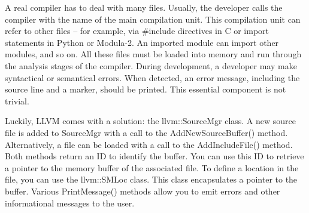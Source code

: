 A real compiler has to deal with many files. Usually, the developer calls the compiler with the name of the main compilation unit. This compilation unit can refer to other files – for example, via \#include directives in C or import statements in Python or Modula-2. An imported module can import other modules, and so on. All these files must be loaded into memory and run through the analysis stages of the compiler. During development, a developer may make syntactical or semantical errors. When detected, an error message, including the source line and a marker, should be printed. This essential component is not trivial.

Luckily, LLVM comes with a solution: the llvm::SourceMgr class. A new source file is added to SourceMgr with a call to the AddNewSourceBuffer() method. Alternatively, a file can be loaded with a call to the AddIncludeFile() method. Both methods return an ID to identify the buffer. You can use this ID to retrieve a pointer to the memory buffer of the associated file. To define a location in the file, you can use the llvm::SMLoc class. This class encapsulates a pointer to the buffer. Various PrintMessage() methods allow you to emit errors and other informational messages to the user.